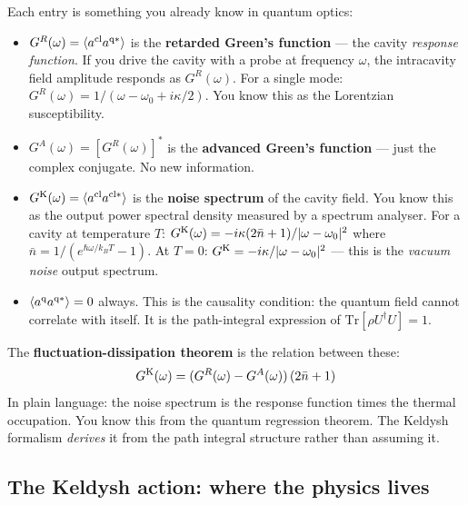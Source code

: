 \documentclass[12pt]{article}
\newcommand{\cl}{{\rm cl}}
\newcommand{\q}{{\rm q}}
\newcommand{\Keldysh}{{\rm K}}
\begin{document}
Each entry is something you already know in quantum optics:

\begin{itemize}
  \item \textbf{$G^R(\omega) = \langle a^\cl a^{\q*}\rangle$}
    is the \textbf{retarded Green's function} --- the cavity
    \emph{response function}.  If you drive the cavity with a probe at
    frequency $\omega$, the intracavity field amplitude responds as
    $G^R(\omega)$.  For a single mode:
    $G^R(\omega) = 1/(\omega - \omega_0 + i\kappa/2)$.
    You know this as the Lorentzian susceptibility.

  \item \textbf{$G^A(\omega) = [G^R(\omega)]^*$}
    is the \textbf{advanced Green's function} --- just the complex
    conjugate.  No new information.

  \item \textbf{$G^\Keldysh(\omega) = \langle a^\cl a^{\cl*}\rangle$}
    is the \textbf{noise spectrum} of the cavity field.  You know this
    as the output power spectral density measured by a spectrum analyser.
    For a cavity at temperature $T$:
    $G^\Keldysh(\omega) = -i\kappa(2\bar{n}+1)/|{\omega-\omega_0}|^2$
    where $\bar{n} = 1/(e^{\hbar\omega/k_BT}-1)$.
    At $T=0$: $G^\Keldysh = -i\kappa/|\omega-\omega_0|^2$ --- this is
    the \emph{vacuum noise} output spectrum.

  \item \textbf{$\langle a^\q a^{\q*}\rangle = 0$} always.
    This is the causality condition: the quantum field cannot correlate
    with itself.  It is the path-integral expression of
    $\mathrm{Tr}[\rho U^\dagger U] = 1$.
\end{itemize}

The \textbf{fluctuation-dissipation theorem} is the relation between
these:
\begin{equation}
  G^\Keldysh(\omega) =
  (G^R(\omega) - G^A(\omega))\,(2\bar{n}+1)
  \label{eq:FDT_recall}
\end{equation}
In plain language: the noise spectrum is the response function times
the thermal occupation.  You know this from the quantum regression
theorem.  The Keldysh formalism \emph{derives} it from the path integral
structure rather than assuming it.

\subsection{The Keldysh action: where the physics lives}
\end{document}
